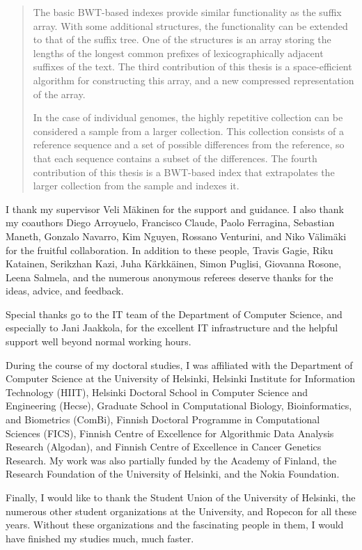 \documentclass[officiallayout]{tktla}
\theoremstyle{definition}
\theoremstyle{remark}
\begin{document}
\begin{abstract}
The basic BWT-based indexes provide similar functionality as the suffix array. With some additional structures, the functionality can be extended to that of the suffix tree. One of the structures is an array storing the lengths of the longest common prefixes of lexicographically adjacent suffixes of the text. The third contribution of this thesis is a space-efficient algorithm for constructing this array, and a new compressed representation of the array.

In the case of individual genomes, the highly repetitive collection can be considered a sample from a larger collection. This collection consists of a reference sequence and a set of possible differences from the reference, so that each sequence contains a subset of the differences. The fourth contribution of this thesis is a BWT-based index that extrapolates the larger collection from the sample and indexes it.
\end{abstract}


\begin{acknowledgements}
I thank my supervisor Veli Mäkinen for the support and guidance. I also thank my coauthors Diego Arroyuelo, Francisco Claude, Paolo Ferragina, Sebastian Maneth, Gonzalo Navarro, Kim Nguyen, Rossano Venturini, and Niko Välimäki for the fruitful collaboration. In addition to these people, Travis Gagie, Riku Katainen, Serikzhan Kazi, Juha Kärkkäinen, Simon Puglisi, Giovanna Rosone, Leena Salmela, and the numerous anonymous referees deserve thanks for the ideas, advice, and feedback.

Special thanks go to the IT team of the Department of Computer Science, and especially to Jani Jaakkola, for the excellent IT infrastructure and the helpful support well beyond normal working hours.

During the course of my doctoral studies, I was affiliated with the Department of Computer Science at the University of Helsinki, Helsinki Institute for Information Technology (HIIT), Helsinki Doctoral School in Computer Science and Engineering (Hecse), Graduate School in Computational Biology, Bioinformatics, and Biometrics (ComBi), Finnish Doctoral Programme in Computational Sciences (FICS), Finnish Centre of Excellence for Algorithmic Data Analysis Research (Algodan), and Finnish Centre of Excellence in Cancer Genetics Research. My work was also partially funded by the Academy of Finland, the Research Foundation of the University of Helsinki, and the Nokia Foundation.

Finally, I would like to thank the Student Union of the University of Helsinki, the numerous other student organizations at the University, and Ropecon for all these years. Without these organizations and the fascinating people in them, I would have finished my studies much, much faster.
\end{acknowledgements}
\end{document}
